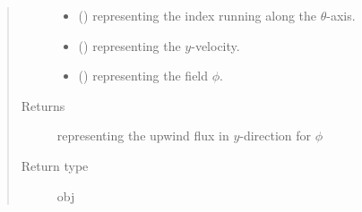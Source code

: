 \documentclass[letterpaper,10pt,english]{sphinxmanual}
\begin{document}
\begin{fulllineitems}
\begin{fulllineitems}
\begin{quote}
\begin{description}
\begin{itemize}
\item {} 
 () \textendash{}  representing the index running along the \(\theta\)-axis.

\item {} 
 () \textendash{}  representing the \(y\)-velocity.

\item {} 
 () \textendash{}  representing the field \(\phi\).

\end{itemize}

\item[{Returns}] \leavevmode
{} representing the upwind flux in \(y\)-direction for \(\phi\)

\item[{Return type}] \leavevmode
obj

\end{description}\end{quote}

\end{fulllineitems}


\end{fulllineitems}

\end{document}
